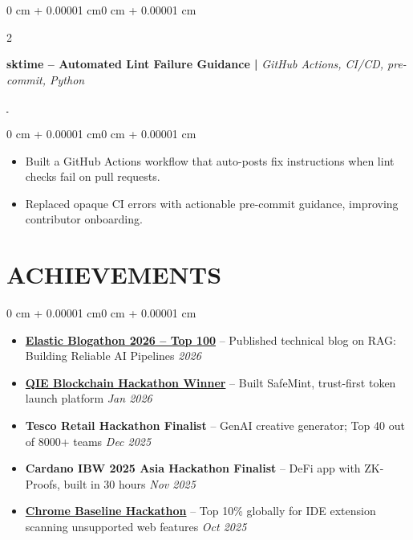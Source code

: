 \documentclass[1pt, letterpaper]{article}
\newenvironment{onecolentry}{
    \begin{adjustwidth}{0 cm + 0.00001 cm}{0 cm + 0.00001 cm}
}{
    \end{adjustwidth}
}
\newenvironment{twocolentry}[2][]{
    \onecolentry
    \def\secondColumn{#2}
    \setcolumnwidth{\fill, 4.5 cm}
    \begin{paracol}{2}
}{
    \switchcolumn \raggedleft \secondColumn
    \end{paracol}
    \endonecolentry
}
\let\hrefWithoutArrow\href
\begin{document}
    \begin{twocolentry}{
        {\hrefWithoutArrow{https://github.com/sktime/sktime/pull/9546}{\,\faExternalLink*}}%
    }
        \vspace{-3pt}
        \textbf{sktime -- Automated Lint Failure Guidance |}
        \textit{GitHub Actions, CI/CD, pre-commit, Python}
    \end{twocolentry}
    \begin{onecolentry}
        \vspace{0mm}
        \begin{itemize}
            \item Built a GitHub Actions workflow that auto-posts fix instructions when lint checks fail on pull requests.
            \item Replaced opaque CI errors with actionable pre-commit guidance, improving contributor onboarding.
        \end{itemize}
    \end{onecolentry}

    \vspace{-1pt}

    \section{ACHIEVEMENTS}
    \begin{onecolentry}
        \begin{itemize}
            \item \textbf{\href{https://medium.com/@madheshsasikala81/rag-building-reliable-ai-pipelines-0d9881357767}{Elastic Blogathon 2026 -- Top 100}} -- Published technical blog on RAG: Building Reliable AI Pipelines \hfill \textit{2026}
            \item \textbf{\href{https://www.linkedin.com/feed/update/urn:li:activity:7426567594813464576/?rcm=ACoAAE75s30BtxiAeYQDdY0DUh39cPFwdczGKS8}{QIE Blockchain Hackathon Winner}} -- Built SafeMint, trust-first token launch platform \hfill \textit{Jan 2026}
            \item \textbf{Tesco Retail Hackathon Finalist} -- GenAI creative generator; Top 40 out of 8000+ teams \hfill \textit{Dec 2025}
            \item \textbf{Cardano IBW 2025 Asia Hackathon Finalist} -- DeFi app with ZK-Proofs, built in 30 hours \hfill \textit{Nov 2025}
            \item \textbf{\href{https://devpost.com/software/baseline-extension}{Chrome Baseline Hackathon}} -- Top 10\% globally for IDE extension scanning unsupported web features \hfill \textit{Oct 2025}
        \end{itemize}
    \end{onecolentry}
\end{document}
